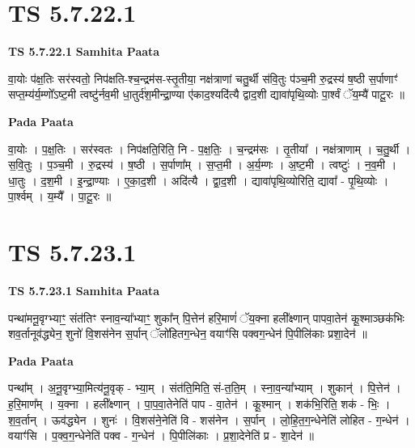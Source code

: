 \documentclass[17pt]{extarticle}
\begin{document}

\section{ TS 5.7.22.1 }

\textbf{TS 5.7.22.1 } \newline
\textbf{Samhita Paata} \newline

वा॒योः प॑क्ष॒तिः सर॑स्वतो॒ निप॑क्षति-श्च॒न्द्रम॑स-स्तृ॒तीया॒ नक्ष॑त्राणां चतु॒र्थी स॑वि॒तुः प॑ञ्च॒मी रु॒द्रस्य॑ ष॒ष्ठी स॒र्पाणाꣳ॑ सप्त॒म्य॑र्य॒म्णो᳚ऽष्ट॒मी त्वष्टु॑र्नव॒मी धा॒तुर्द॑श॒मीन्द्रा॒ण्या ए॑काद॒श्यदि॑त्यै द्वाद॒शी द्यावा॑पृथि॒व्योः पा॒र्श्वं ॅय॒म्यै॑ पाटू॒रः ॥ \newline

\textbf{Pada Paata} \newline

वा॒योः । प॒क्ष॒तिः । सर॑स्वतः । निप॑क्षति॒रिति॒ नि - प॒क्ष॒तिः॒ । च॒न्द्रम॑सः । तृ॒तीया᳚ । नक्ष॑त्राणाम् । च॒तु॒र्थी । स॒वि॒तुः । प॒ञ्च॒मी । रु॒द्रस्य॑ । ष॒ष्ठी । स॒र्पाणा᳚म् । स॒प्त॒मी । अ॒र्य॒म्णः । अ॒ष्ट॒मी । त्वष्टुः॑ । न॒व॒मी । धा॒तुः । द॒श॒मी । इ॒न्द्रा॒ण्याः । ए॒का॒द॒शी । अदि॑त्यै । द्वा॒द॒शी । द्यावा॑पृथि॒व्योरिति॒ द्यावा᳚ - पृ॒थि॒व्योः । पा॒र्श्वम् । य॒म्यै᳚ । पा॒टू॒रः ॥  \newline





\section{ TS 5.7.23.1 }

\textbf{TS 5.7.23.1 } \newline
\textbf{Samhita Paata} \newline

पन्था॑मनू॒वृग्भ्याꣳ॒॒ संत॑तिꣳ स्नाव॒न्या᳚भ्याꣳ॒॒ शुका᳚न् पि॒त्तेन॑ हरि॒माणं॑ ॅय॒क्ना हली᳚क्ष्णान् पापवा॒तेन॑ कू॒श्माञ्छक॑भिः शव॒र्तानूव॑द्ध्येन॒ शुनो॑ वि॒शस॑नेन स॒र्पान् ॅलो॑हितग॒न्धेन॒ वयाꣳ॑सि पक्वग॒न्धेन॑ पि॒पीलि॑काः प्रशा॒देन॑ ॥ \newline

\textbf{Pada Paata} \newline

पन्था᳚म् । अ॒नू॒वृग्भ्या॒मित्य॑नू॒वृक् - भ्या॒म् । संत॑ति॒मिति॒ सं-त॒ति॒म् । स्ना॒व॒न्या᳚भ्याम् । शुकान्॑ । पि॒त्तेन॑ । ह॒रि॒माण᳚म् । य॒क्ना । हली᳚क्ष्णान् । पा॒प॒वा॒तेनेति॑ पाप - वा॒तेन॑ । कू॒श्मान् । शक॑भि॒रिति॒ शक॑ - भिः॒ । श॒व॒र्तान् । ऊव॑द्ध्येन । शुनः॑ । वि॒शस॑ने॒नेति॑ वि - शस॑नेन । स॒र्पान् । लो॒हि॒त॒ग॒न्धेनेति॑ लोहित - ग॒न्धेन॑ । वयाꣳ॑सि । प॒क्व॒ग॒न्धेनेति॑ पक्व - ग॒न्धेन॑ । पि॒पीलि॑काः । प्र॒शा॒देनेति॑ प्र - शा॒देन॑ ॥  \newline
\end{document}
